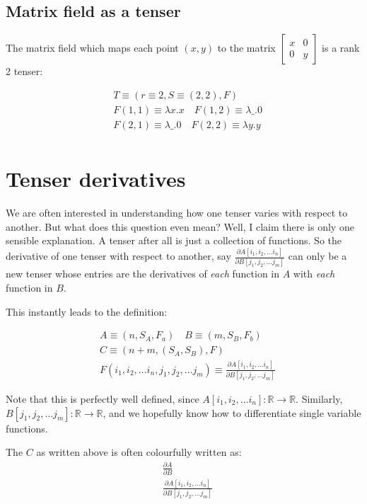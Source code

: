 \documentclass{article}
\begin{document}
\subsection{Matrix field as a tenser}
The matrix field which maps each point $(x, y)$ to the matrix 
$
\begin{bmatrix}
x & 0 \\ 0 & y
\end{bmatrix}
$
is a rank 2 tenser:

\begin{align*}
&T \equiv (r\equiv 2, S \equiv (2, 2), F) \\
&F(1, 1) \equiv \lambda x. x \quad F(1, 2) \equiv \lambda \_. 0 \\
&F(2, 1) \equiv \lambda \_. 0 \quad F(2, 2) \equiv \lambda y. y \\
\end{align*}

\section{Tenser derivatives}

We are often interested in understanding how one tenser varies with respect
to another. But what does this question even mean? Well, I claim there is
only one sensible explanation. A tenser after all is just a collection of 
functions. So the derivative of one tenser with respect to another, say 
$\frac{\partial A[i_1, i_2, \dots i_n]}{\partial B[j_1, j_2, \dots j_m]}$ can
only be a new tenser  whose entries are the derivatives of \textit{each} function in $A$ with \textit{each}
function in $B$.

This instantly leads to the definition:

\begin{align*}
&A \equiv (n, S_A, F_a) \quad B \equiv (m, S_B, F_b) \\
&C \equiv (n+m, (S_A, S_B), F) \\
&F(i_1, i_2, \dots i_n, j_1, j_2, \dots j_m) \equiv 
    \frac{\partial A[i_1, i_2, \dots i_n]}{\partial B[j_1, j_2, \dots j_m]}
\end{align*}

Note that this is perfectly well defined, since
$A[i_1, i_2, \dots i_n]: \mathbb R \rightarrow \mathbb R$. Similarly,
$B[j_1, j_2, \dots j_m]: \mathbb R \rightarrow \mathbb R$, and we hopefully
know how to differentiate single variable functions.

The $C$ as written above is often colourfully written as:
\begin{align*}
&\frac{\partial A}{\partial B} \\
&\frac{\partial A[i_1, i_2, \dots i_n]}{\partial B[j_1, j_2, \dots j_m]}
\end{align*}
\end{document}
